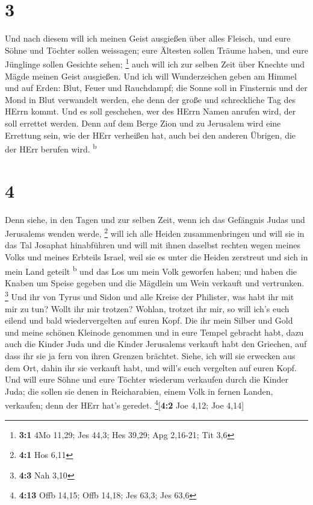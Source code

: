 \hypertarget{section-2}{%
\section{3}\label{section-2}}

 Und nach diesem will ich meinen Geist ausgießen über
alles Fleisch, und eure Söhne und Töchter sollen weissagen; eure
Ältesten sollen Träume haben, und eure Jünglinge sollen Gesichte sehen;
\footnote{\textbf{3:1} 4Mo 11,29; Jes 44,3; Hes 39,29; Apg 2,16-21; Tit
  3,6}  auch will ich zur selben Zeit über Knechte und
Mägde meinen Geist ausgießen.  Und ich will Wunderzeichen
geben am Himmel und auf Erden: Blut, Feuer und Rauchdampf;
 die Sonne soll in Finsternis und der Mond in Blut
verwandelt werden, ehe denn der große und schreckliche Tag des HErrn
kommt.  Und es soll geschehen, wer des HErrn Namen anrufen
wird, der soll errettet werden. Denn auf dem Berge Zion und zu Jerusalem
wird eine Errettung sein, wie der HErr verheißen hat, auch bei den
anderen Übrigen, die der HErr berufen wird. \textsuperscript{b}

\hypertarget{section-3}{%
\section{4}\label{section-3}}

 Denn siehe, in den Tagen und zur selben Zeit, wenn ich
das Gefängnis Judas und Jerusalems wenden werde, \footnote{\textbf{4:1}
  Hos 6,11}  will ich alle Heiden zusammenbringen und will
sie in das Tal Josaphat hinabführen und will mit ihnen daselbst rechten
wegen meines Volks und meines Erbteils Israel, weil sie es unter die
Heiden zerstreut und sich in mein Land geteilt \textsuperscript{b}
 und das Los um mein Volk geworfen haben; und haben die
Knaben um Speise gegeben und die Mägdlein um Wein verkauft und
vertrunken. \footnote{\textbf{4:3} Nah 3,10}  Und ihr von
Tyrus und Sidon und alle Kreise der Philister, was habt ihr mit mir zu
tun? Wollt ihr mir trotzen? Wohlan, trotzet ihr mir, so will ich's euch
eilend und bald wiedervergelten auf euren Kopf.  Die ihr
mein Silber und Gold und meine schönen Kleinode genommen und in eure
Tempel gebracht habt,  dazu auch die Kinder Juda und die
Kinder Jerusalems verkauft habt den Griechen, auf dass ihr sie ja fern
von ihren Grenzen brächtet.  Siehe, ich will sie erwecken
aus dem Ort, dahin ihr sie verkauft habt, und will's euch vergelten auf
euren Kopf.  Und will eure Söhne und eure Töchter wiederum
verkaufen durch die Kinder Juda; die sollen sie denen in Reicharabien,
einem Volk in fernen Landen, verkaufen; denn der HErr hat's geredet.
\footnote{\textbf{4:13} Offb 14,15; Offb 14,18; Jes 63,3; Jes 63,6}{[}\textbf{4:2}
Joe 4,12; Joe 4,14{]}

